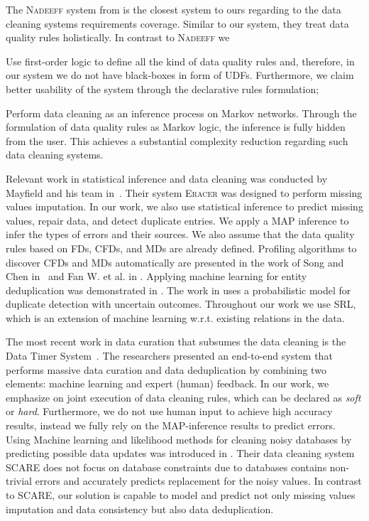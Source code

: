 The \textsc{Nadeeff} system from \cite{Dallachiesa:2013:NCD:2463676.2465327} is the closest system to ours regarding to the data cleaning systems requirements coverage. Similar to our system, they treat data quality rules holistically. In contrast to \textsc{Nadeeff} we 
\begin{inparaenum}[\itshape 1\upshape)]
	\item Use first-order logic to define all the kind of data quality rules and, therefore, in our system we do not have black-boxes in form of UDFs. Furthermore, we claim better usability of the system through the declarative rules formulation;
	\item Perform data cleaning as an inference process on Markov networks. Through the formulation of data quality rules as Markov logic, the inference is fully hidden from the user. This achieves a substantial complexity reduction regarding such data cleaning systems.
\end{inparaenum}  

Relevant work in statistical inference and data cleaning was conducted by Mayfield and his team in~\cite{Mayfield:2010:EDA:1807167.1807178}. Their system \textsc{Eracer} was designed to perform missing values imputation. In our work, we also use statistical inference to predict missing values, repair data, and detect duplicate entries. We apply a MAP inference to infer the types of errors and their sources. We also assume that the data quality rules based on FDs, CFDs, and MDs are already defined. Profiling algorithms to discover CFDs and MDs automatically are presented in the work of Song and Chen in~\cite{song2009discovering} and Fan W. et al. in \cite{Fan:2011:DCF:1978258.1978514}. Applying machine learning for entity deduplication was demonstrated in \cite{guo2010record}. The work in \cite{beskales2010probclean} uses a probabilistic model for duplicate detection with uncertain outcomes. Throughout our work we use SRL, which is an extension of machine learning w.r.t. existing relations in the data.

The most recent work in data curation that subsumes the data cleaning is the Data Timer System~\cite{Stonebraker_datacuration}. The researchers presented an end-to-end system that performs massive data curation and data deduplication by combining two elements: machine learning and expert (human) feedback. In our work, we emphasize on joint execution of data cleaning rules, which can be declared as \textit{soft} or \textit{hard}. Furthermore, we do not use human input to achieve high accuracy results, instead we fully rely on the MAP-inference results to predict errors. Using Machine learning and likelihood methods for cleaning noisy databases by predicting possible data updates was introduced in \cite{Yakout:2013:DSU:2463676.2463706}. Their data cleaning system \textsc{SCARE} does not focus on database constraints due to databases contains non-trivial errors and accurately predicts replacement for the noisy values. In contrast to \textsc{SCARE}, our solution is capable to model and predict not only missing values imputation and data consistency but also data deduplication. 

